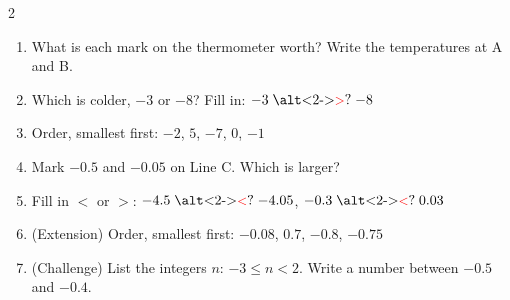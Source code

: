 \documentclass{beamer}
\newcommand{\ashow}[1]{\uncover<2->{\textcolor{red}{\small #1}}}
\newcommand{\ashowq}[1]{\alt<2->{\textcolor{red}{\small #1}}{?}}
\begin{document}
\begin{frame}
\begin{columns}[T]
\begin{multicols}{2}
\begin{enumerate}
  \item What is each mark on the thermometer worth? Write the temperatures at A and B. \ashow{$2\,^\circ$C per mark; A $=-6$, B $=4$}

  \item Which is colder, $-3$ or $-8$? Fill in: $-3 \mathrel{\text{\ashowq{$>$}}} -8$ \ashow{($-8$ is colder)}

  \item Order, smallest first: $-2$, $5$, $-7$, $0$, $-1$ \ashow{($-7,-2,-1,0,5$)}

  \columnbreak

  \item Mark $-0.5$ and $-0.05$ on Line C. Which is larger? \ashow{$-0.05$}

  \item Fill in $<$ or $>$: $-4.5 \mathrel{\text{\ashowq{$<$}}} -4.05$, $-0.3 \mathrel{\text{\ashowq{$<$}}} 0.03$

  \item (Extension) Order, smallest first: $-0.08$, $0.7$, $-0.8$, $-0.75$ \ashow{($-0.8$, $-0.75$, $-0.08$, $0.7$)}

  \item (Challenge) List the integers $n$: $-3\leq n<2$. Write a number between $-0.5$ and $-0.4$. \ashow{$-3,-2,-1,0,1$; e.g.\ $-0.45$}

\end{enumerate}
\end{multicols}

\end{columns}

\end{frame}
\end{document}
